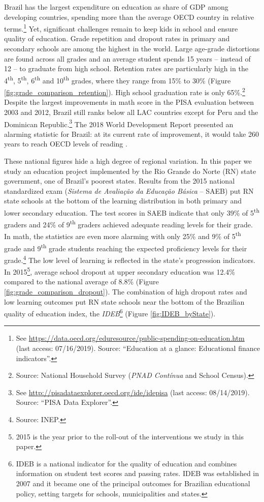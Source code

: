 \documentclass[11pt,a4paper]{article}
\begin{document}
	Brazil has the largest expenditure on education as share of GDP among developing countries, spending more than the average OECD country in relative terms.\footnote{See \url{https://data.oecd.org/eduresource/public-spending-on-education.htm} (last access: 07/16/2019). Source: ``Education at a glance: Educational finance indicators''.} Yet, significant challenges remain to keep kids in school and ensure quality of education. Grade repetition and dropout rates in primary and secondary schools are among the highest in the world. Large age-grade distortions are found across all grades and an average student spends 15 years -- instead of 12 -- to graduate from high school. Retention rates are particularly high in the 4\textsuperscript{th}, 5\textsuperscript{th}, 6\textsuperscript{th} and 10\textsuperscript{th} grades, where they range from 15\% to 30\% (Figure \ref{fig:grade_comparison_retention}). High school graduation rate is only 65\%.\footnote{Source: National Household Survey (\textit{PNAD Contínua} and School Census).} Despite the largest improvements in math score in the PISA evaluation between 2003 and 2012, Brazil still ranks below all LAC countries except for Peru and the Dominican Republic.\footnote{See \url{http://pisadataexplorer.oecd.org/ide/idepisa} (last access: 08/14/2019). Source: ``PISA Data Explorer''.} The 2018 World Development Report presented an alarming statistic for Brazil: at its current rate of improvement, it would take 260 years to reach OECD levels of reading \citep{WDR2018}. 
	
	These national figures hide a high degree of regional variation. In this paper we study an education project implemented by the Rio Grande do Norte (RN) state government, one of Brazil's poorest states. Results from the 2015 national standardized exam (\textit{Sistema de Avaliação da Educação Básica} -- SAEB) put RN state schools at the bottom of the learning distribution in both primary and lower secondary education. The test scores in SAEB indicate that only 39\% of 5\textsuperscript{th} graders and 24\% of 9\textsuperscript{th} graders achieved adequate reading levels for their grade. In math, the statistics are even more alarming with only 25\% and 9\% of 5\textsuperscript{th} grade and 9\textsuperscript{th} grade students reaching the expected proficiency levels for their grade.\footnote{Source: INEP.} The low level of learning is reflected in the state's progression indicators. In 2015\footnote{2015 is the year prior to the roll-out of the interventions we study in this paper.}, average school dropout at upper secondary education was 12.4\% compared to the national average of 8.8\% (Figure \ref{fig:grade_comparison_dropout}). The combination of high dropout rates and low learning outcomes put RN state schools near the bottom of the Brazilian quality of education index, the \textit{IDEB}\footnote{IDEB is a national indicator for the quality of education and combines information on student test scores and passing rates. IDEB was established in 2007 and it became one of the principal outcomes for Brazilian educational policy, setting targets for schools, municipalities and states.} (Figure \ref{fig:IDEB_byState}).
	
\end{document}
